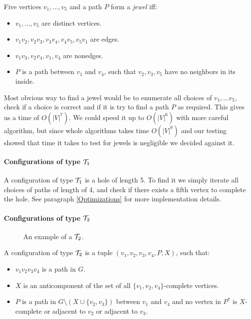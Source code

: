 \documentclass{article}
\begin{document}
Five vertices $v_1, \ldots, v_5$ and a path $P$ form a \emph{jewel} iff:

\begin{itemize}
	\item $v_1, \ldots, v_5$ are distinct vertices.
	\item $v_1v_2, v_2v_3, v_3v_4, v_4v_5, v_5v_1$ are edges.
	\item $v_1v_3, v_2v_4, v_1,v_4$ are nonedges.
	\item $P$ is a path between $v_1$ and $v_4$, such that $v_2, v_3, v_5$ have no neighbors in its inside.
\end{itemize}

Most obvious way to find a jewel would be to enumerate all choices of $v_1, \ldots v_5$, check if a choice is correct and if it is try to find a path $P$ as required. This gives us a time of $O(|V|^7)$. We could speed it up to $O(|V|^6)$ with more careful algorithm, but since whole algorithms takes time $O(|V|^9)$ and our testing showed that time it takes to test for jewels is negligible we decided against it.

\paragraph{Configurations of type $\mathcal{T}_1$}

A configuration of type $\mathcal{T}_1$ is a hole of length 5. To find it we simply iterate all choices of paths of length of 4, and check if there exists a fifth vertex to complete the hole. See paragraph \ref{Optimizations} for more implementation details.

\paragraph{Configurations of type $\mathcal{T}_2$}

\begin{wrapfigure}{r}{0.35\textwidth}
	
	\caption{An example of a $\mathcal{T}_2$.}%
	\vspace{-1.5cm}
\end{wrapfigure}

A configuration of type $\mathcal{T}_2$ is a tuple $(v_1, v_2, v_3, v_4, P, X)$, such that:
\begin{itemize}
	\item $v_1v_2v_3v_4$ is a path in $G$.
	\item $X$ is an anticomponent of the set of all $\{v_1, v_2, v_4\}$-complete vertices.
	\item $P$ is a path in $G\setminus(X \cup \{v_2, v_3\})$ between $v_1$ and $v_4$ and no vertex in $P^*$ is $X$-complete or adjacent to $v_2$ or adjacent to $v_3$.
\end{itemize}
\end{document}
